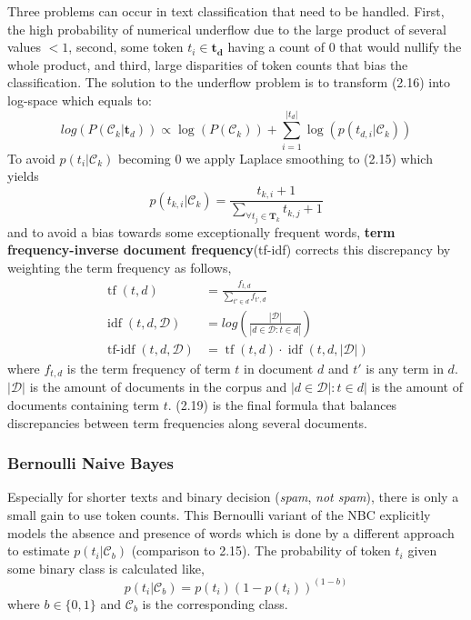   Three problems can occur in text classification that need to be handled.
  First, the high probability of numerical underflow due to the large product of several values $<1$, second, some token $t_i \in \boldsymbol{t_d}$ having a count of $0$ that would nullify the whole product, and third, large disparities of token counts that bias the classification.
  The solution to the underflow problem is to transform (2.16) into log-space which equals to:
  \[log(P(\mathcal{C}_k|\boldsymbol{t}_d)) \propto \log(P(\mathcal{C}_k)) + \sum_{i=1}^{|t_{d}|} \log({p(t_{d,i}|\mathcal{C}_k)}) \]
  To avoid $p({t_{i}}|\mathcal{C}_k)$ becoming $0$ we apply Laplace smoothing to (2.15) which yields
  \[ p({t_{k,i}}|\mathcal{C}_k) = \frac{t_{k, i} + 1}{\sum_{\forall t_j \in \boldsymbol{T}_k} t_{k, j} + 1} \]
  and to avoid a bias towards some exceptionally frequent words, \textbf{term frequency-inverse document frequency}(\gls{tf-idf}) corrects this discrepancy by weighting the term frequency as follows,
  \begin{align}
    \operatorname{tf}(t,d) &= \frac{f_{t,d}}{\sum_{t' \in d} f_{t',d}}\\
    \operatorname{idf}(t,d, \mathcal{D}) &= log\left( \frac{|\mathcal{D}|}{|d \in \mathcal{D}: t \in d|}\right)\\
    \operatorname{tf-idf}(t,d, \mathcal{D}) &= \operatorname{tf}(t,d) \cdot \operatorname{idf}(t,d, |\mathcal{D}|)
  \end{align}
  where $f_{t,d}$ is the term frequency of term $t$ in document $d$ and $t'$ is any term in $d$.
  $|\mathcal{D}|$ is the amount of documents in the corpus and $|d \in \mathcal{D}|: t \in d|$ is the amount of documents containing term $t$.
  (2.19) is the final formula that balances discrepancies between term frequencies along several documents.

\subsubsection{Bernoulli Naive Bayes}
  Especially for shorter texts and binary decision (\textsl{spam}, \textsl{not spam}), there is only a small gain to use token counts.
  This Bernoulli variant of the NBC explicitly models the absence and presence of words which is done by a different approach to estimate $p(t_{i}|\mathcal{C}_b)$ (comparison to 2.15).
  The probability of token $t_i$ given some binary class is calculated like,
  \[p(t_{i}|\mathcal{C}_b) = p(t_{i})(1-p(t_{i}))^{(1-b)}\]
  where $b \in \{0,1\}$ and $\mathcal{C}_b$ is the corresponding class.

